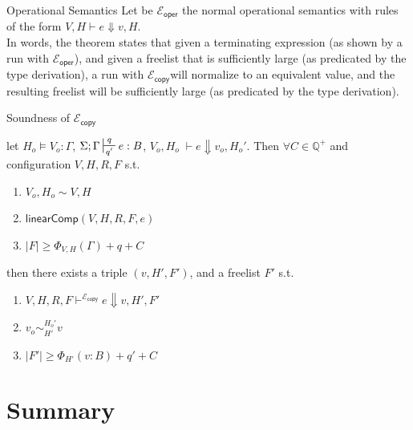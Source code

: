 \documentclass{beamer}
\newcommand{\ms}[1]{\ensuremath{\mathsf{#1}}}
\newcounter{rule}
\newcommand{\wfc}[5]{\mathsf{linearComp}(#1,#2,#3,#4,#5)}
\newcommand{\veq}[4]{#3 \sim^{#1}_{#2} #4}
\newcommand{\copySem}{\ensuremath{\mathcal{E}_{\ms{copy}}}}
\theoremstyle{definition}
\begin{document}
\begin{frame}{Operational Semantics}
  Let be $\mathcal{E}_{\ms{oper}}$ the normal operational semantics with
  rules of the form $V,H \vdash e \Downarrow v,H$.\\
  
  In words, the theorem states that given a terminating expression (as shown by a run with
  $\mathcal{E}_{\ms{oper}}$),
and given a freelist that is sufficiently large (as predicated by the type derivation), 
a run with \copySem will normalize to an equivalent value, and the resulting freelist 
will be sufficiently large (as predicated by the type derivation).
\end{frame}

\begin{frame}{Soundness of \copySem}
\begin{theorem}[Soundness]
\label{b} let $H_o \vDash V_o : \Gamma$, $\Sigma; \Gamma \sststile{q'}{q} e : B$,
$V_o,H_o \; \vdash e \Downarrow v_o, H_o'$.
Then $\forall C \in \mathbb{Q}^{+}$ and configuration $V,H,R,F$ s.t.
\begin{enumerate} 
\item $V_o,H_o \sim V,H$
\item $\wfc{V}{H}{R}{F}{e}$
\item $|F| \ge \Phi_{V,H}(\Gamma) + q + C$ 
\end{enumerate}
then there exists a triple $(v,H',F')$, and a freelist $F'$ s.t.
\begin{enumerate}
  \item $V,H,R,F \vdash^{\copySem} e \Downarrow v, H', F'$
	\item $\veq{H_o'}{H'}{v_o}{v}$
  \item $|F'| \ge \Phi_{H'}(v:B) + q' + C$
\end{enumerate}
\end{theorem}
\end{frame}

  
\section*{Summary}
\end{document}
